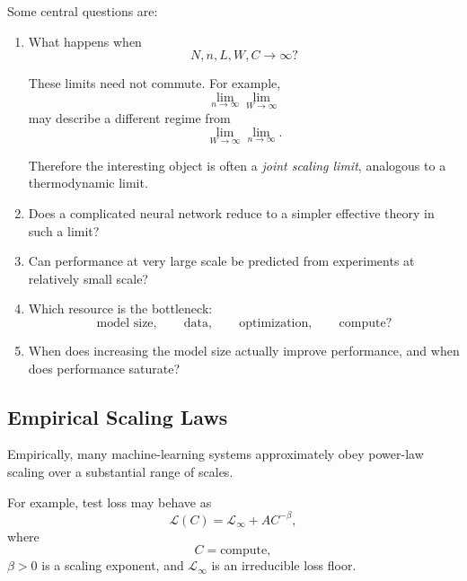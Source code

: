 Some central questions are:

\begin{enumerate}
    \item What happens when
    \begin{equation}
        N,n,L,W,C\rightarrow\infty?
    \end{equation}

    These limits need not commute. For example,
    \begin{equation}
        \lim_{n\rightarrow\infty}
        \lim_{W\rightarrow\infty}
    \end{equation}
    may describe a different regime from
    \begin{equation}
        \lim_{W\rightarrow\infty}
        \lim_{n\rightarrow\infty}.
    \end{equation}

    Therefore the interesting object is often a \emph{joint scaling limit},
    analogous to a thermodynamic limit.

    \item Does a complicated neural network reduce to a simpler effective theory
    in such a limit?

    \item Can performance at very large scale be predicted from experiments at
    relatively small scale?

    \item Which resource is the bottleneck:
    \begin{equation}
        \text{model size},\qquad
        \text{data},\qquad
        \text{optimization},\qquad
        \text{compute}?
    \end{equation}

    \item When does increasing the model size actually improve performance, and
    when does performance saturate?
\end{enumerate}


\subsection{Empirical Scaling Laws}

Empirically, many machine-learning systems approximately obey power-law scaling
over a substantial range of scales.

For example, test loss may behave as
\begin{equation}
    \boxed{
    \mathcal L(C)
    =
    \mathcal L_\infty
    +
    A C^{-\beta},
    }
\end{equation}
where
\begin{equation}
    C=\text{compute},
\end{equation}
$\beta>0$ is a scaling exponent, and $\mathcal L_\infty$ is an irreducible
loss floor.

